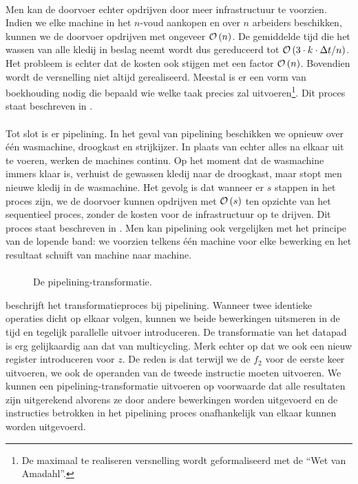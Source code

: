 \paragraph{}
Men kan de doorvoer echter opdrijven door meer infrastructuur te voorzien. Indien we elke machine in het $n$-voud aankopen en over $n$ arbeiders beschikken, kunnen we de doorvoer opdrijven met ongeveer $\mathcal{O}\left(n\right)$. De gemiddelde tijd die het wassen van alle kledij in beslag neemt wordt dus gereduceerd tot $\mathcal{O}\left(3\cdot k\cdot\Delta t/n\right)$. Het probleem is echter dat de kosten ook stijgen met een factor $\mathcal{O}\left(n\right)$. Bovendien wordt de versnelling niet altijd gerealiseerd. Meestal is er een vorm van boekhouding nodig die bepaald wie welke taak precies zal uitvoeren\footnote{De maximaal te realiseren versnelling wordt geformaliseerd met de ``Wet van Amadahl''.}. Dit proces staat beschreven in .
\paragraph{}
Tot slot is er pipelining. In het geval van pipelining beschikken we opnieuw over \'e\'en wasmachine, droogkast en strijkijzer. In plaats van echter alles na elkaar uit te voeren, werken de machines continu. Op het moment dat de wasmachine immers klaar is, verhuist de gewassen kledij naar de droogkast, maar stopt men nieuwe kledij in de wasmachine. Het gevolg is dat wanneer er $s$ stappen in het proces zijn, we de doorvoer kunnen opdrijven met $\mathcal{O}\left(s\right)$ ten opzichte van het sequentieel proces, zonder de kosten voor de infrastructuur op te drijven. Dit proces staat beschreven in . Men kan pipelining ook vergelijken met het principe van de lopende band: we voorzien telkens \'e\'en machine voor elke bewerking en het resultaat schuift van machine naar machine.
\paragraph{}
\begin{figure}[hbt]
\centering
{}
\caption{De pipelining-transformatie.}
\end{figure}
 beschrijft het transformatieproces bij pipelining. Wanneer twee identieke operaties dicht op elkaar volgen, kunnen we beide bewerkingen uitsmeren in de tijd en tegelijk parallelle uitvoer introduceren. De transformatie van het datapad is erg gelijkaardig aan dat van multicycling. Merk echter op dat we ook een nieuw register introduceren voor $z$. De reden is dat terwijl we de $f_2$ voor de eerste keer uitvoeren, we ook de operanden van de tweede instructie moeten uitvoeren. We kunnen een pipelining-transformatie uitvoeren op voorwaarde dat alle resultaten zijn uitgerekend alvorens ze door andere bewerkingen worden uitgevoerd en de instructies betrokken in het pipelining proces onafhankelijk van elkaar kunnen worden uitgevoerd.
